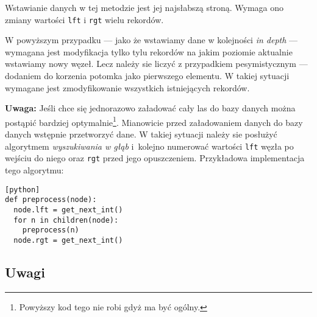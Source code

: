 





Wstawianie danych w tej metodzie jest jej najsłabszą stroną.
Wymaga ono zmiany wartości \texttt{lft} i \texttt{rgt} wielu rekordów.

W powyższym przypadku
--- jako że wstawiamy dane w kolejności \emph{in depth} ---
wymagana jest modyfikacja tylko tylu rekordów na jakim poziomie aktualnie wstawiamy nowy węzeł.
Lecz należy sie liczyć z przypadkiem pesymistycznym --- dodaniem do korzenia potomka jako pierwszego elementu.
W takiej sytuacji wymagane jest zmodyfikowanie wszystkich istniejących rekordów.

\textbf{Uwaga:} Jeśli chce się jednorazowo załadować cały las do bazy danych można postąpić bardziej optymalnie\footnote{
    Powyższy kod tego nie robi gdyż ma być ogólny.
}.
Mianowicie przed załadowaniem danych do bazy danych wstępnie przetworzyć dane.
W takiej sytuacji należy sie posłużyć algorytmem \emph{wyszukiwania w głąb}
i~kolejno numerować wartości \texttt{lft} węzła po wejściu do niego oraz \texttt{rgt} przed jego opuszczeniem.
Przykładowa implementacja tego algorytmu:

\begin{verbatim}[python]
def preprocess(node):
  node.lft = get_next_int()
  for n in children(node):
    preprocess(n)
  node.rgt = get_next_int()
\end{verbatim}







\subsection{Uwagi}


